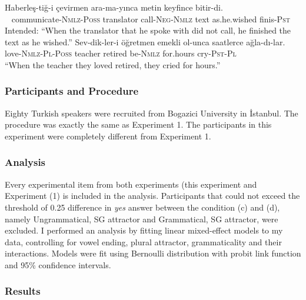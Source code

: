 \documentclass[doc]{apa6}
\begin{document}
\begin{exe}
\ex
\begin{xlist}
\ex \label{filler1a}
\gll * Haberleş-tiğ-i çevirmen ara-ma-yınca metin keyfince bitir-di.\\
{\ } communicate-\textsc{Nmlz}-\textsc{Poss} translator call-\textsc{Neg}-\textsc{Nmlz} text as.he.wished finis-\textsc{Pst}\\
\glt Intended: ``When the translator that he spoke with did not call, he finished the text as he wished.''
\ex \label{filler1b}
\gll Sev-dik-ler-i öğretmen emekli ol-unca saatlerce ağla-dı-lar.\\
love-\textsc{Nmlz}-\textsc{Pl}-\textsc{Poss} teacher retired be-\textsc{Nmlz} for.hours cry-\textsc{Pst}-\textsc{Pl}\\
\glt ``When the teacher they loved retired, they cried for hours.''
\end{xlist}
\end{exe}

\hypertarget{participants-and-procedure-1}{%
\subsubsection{Participants and Procedure}\label{participants-and-procedure-1}}

Eighty Turkish speakers were recruited from Bogazici University in İstanbul. The procedure was exactly the same as Experiment 1. The participants in this experiment were completely different from Experiment 1.

\hypertarget{analysis-1}{%
\subsubsection{Analysis}\label{analysis-1}}

Every experimental item from both experiments (this experiment and Experiment (1) is included in the analysis. Participants that could not exceed the threshold of 0.25 difference in \emph{yes} answer between the condition (c) and (d), namely Ungrammatical, SG attractor and Grammatical, SG attractor, were excluded. I performed an analysis by fitting linear mixed-effect models to my data, controlling for vowel ending, plural attractor, grammaticality and their interactions. Models were fit using Bernoulli distribution with probit link function and 95\% confidence intervals.

\hypertarget{results-1}{%
\subsubsection{Results}\label{results-1}}
\end{document}

